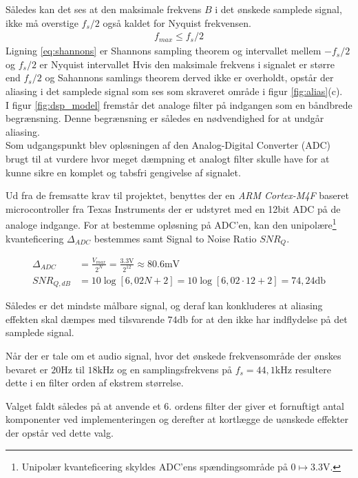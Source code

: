 Således kan det ses at den maksimale frekvens $B$ i det ønskede samplede signal, ikke må overstige $f_s/2$ også kaldet for Nyquist frekvensen.
\begin{align}
	f_{max} \leq f_s/2 \label{eq:shannons}
\end{align}
Ligning \ref{eq:shannons} er Shannons sampling theorem og intervallet mellem $-f_s/2$ og $f_s/2$ er Nyquist intervallet 
Hvis den maksimale frekvens i signalet er større end $f_s/2$ og Sahannons samlings theorem derved ikke er overholdt, opstår der aliasing i det samplede signal som ses som skraveret område i figur \ref{fig:alias}(c).
\\
I figur \ref{fig:dsp_model} fremstår det analoge filter på indgangen som en båndbrede begrænsning.
Denne begrænsning er således en nødvendighed for at undgår aliasing. 
\\
Som udgangspunkt blev opløsningen af den Analog-Digital Converter (ADC) brugt til at vurdere hvor meget dæmpning et analogt filter skulle have for at kunne sikre en komplet og tabsfri gengivelse af signalet.

Ud fra de fremsatte krav til projektet, benyttes der en \emph{ARM Cortex-M4F} baseret microcontroller fra Texas Instruments \cite{spmu296} der er udstyret med en 12bit ADC på de analoge indgange.
For at bestemme opløsning på ADC'en, kan den unipolære\footnote{Unipolær kvanteficering skyldes ADC'ens spændingsområde på $0 \longmapsto \num{3.3}\si{\volt}$.} kvanteficering $\Delta_{ADC}$ bestemmes samt Signal to Noise Ratio $SNR_Q$.
   
\begin{align}
	\Delta_{ADC} &= \frac{V_{max}}{2^N} = \frac{\num{3.3}\si{\volt}}{2^{12}} \approx \num{80.6}\si{\milli\volt}\\
	SNR_{Q,dB} &= 10 \log \left[6,02 N + 2 \right] = 10 \log \left[6,02\cdot 12+2\right] = 74,24 \si{\decibel} 
\end{align}
 
Således er det mindste målbare signal, og deraf kan konkluderes at aliasing effekten skal dæmpes med tilsvarende $74\si{\decibel}$ for at den ikke har indflydelse på det samplede signal.

Når der er tale om et audio signal, hvor det ønskede frekvensområde der ønskes bevaret er $20\si{\hertz}$ til $18\si{\kilo\hertz}$ og en samplingsfrekvens på $f_s = 44,1\si{\kilo\hertz}$ resultere dette i en filter orden af ekstrem størrelse.

Valget faldt således på at anvende et 6. ordens filter der giver et fornuftigt antal komponenter ved implementeringen og derefter at kortlægge de uønskede effekter der opstår ved dette valg. 
 

